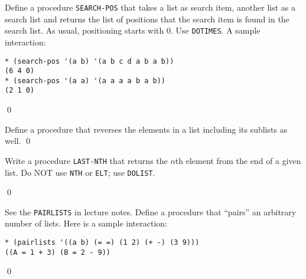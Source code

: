 \documentclass[a4paper,11pt]{article}
\begin{document}
\begin{uexercise}
Define a procedure \Verb+SEARCH-POS+ that takes a list as search item, another list as a search list and returns the list of positions that the search item is found in the search list. As usual, positioning starts with 0. Use \Verb+DOTIMES+. A sample interaction:

{\small
\begin{Verbatim}
* (search-pos '(a b) '(a b c d a b a b))
(6 4 0)
* (search-pos '(a a) '(a a a a b a b))
(2 1 0)
\end{Verbatim}
}
\qed
\end{uexercise}

\begin{uexercise}
Define a procedure that reverses the elements in a list including its sublists as well.
\qed
\end{uexercise}

\begin{uexercise}
Write a procedure \Verb+LAST-NTH+ that returns the $n$th element from the end of a given list. Do NOT use \Verb+NTH+ or \Verb+ELT+; use \Verb+DOLIST+.

\qed
\end{uexercise}

\begin{uexercise}

See the \Verb+PAIRLISTS+ in lecture notes. Define a procedure that ``pairs'' an arbitrary number of lists. Here is a sample interaction:
{\small
\begin{Verbatim}
* (pairlists '((a b) (= =) (1 2) (+ -) (3 9)))
((A = 1 + 3) (B = 2 - 9))
\end{Verbatim}
}

\qed
\end{uexercise}

\noindent\hrulefill

\newpage
\end{document}
